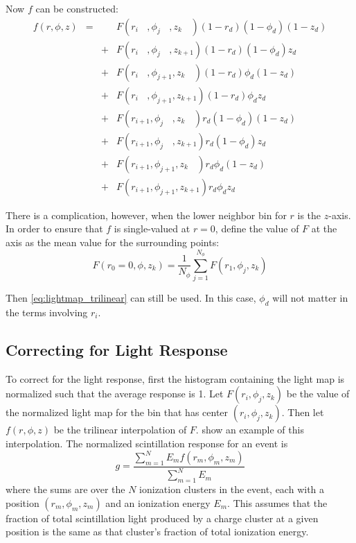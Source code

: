 \documentclass[herrin-thesis.tex]{subfiles}
\begin{document}
Now \(f\) can be constructed:
\begin{align}
f(r, \phi, z) &=&   & F(r_{i\phantom{+1}}, \phi_{j\phantom{+1}}, z_{k\phantom{+1}}) (1-r_d)(1-\phi_d)(1-z_d)	\nonumber\\
		& & + & F(r_{i\phantom{+1}}, \phi_{j\phantom{+1}}, z_{k+1})		     (1-r_d)(1-\phi_d)z_d 		\nonumber\\
		& & + & F(r_{i\phantom{+1}}, \phi_{j+1},		      z_{k\phantom{+1}}) (1-r_d)\phi_d(1-z_d)		\nonumber\\
		& & + & F(r_{i\phantom{+1}}, \phi_{j+1}, 		      z_{k+1})		     (1-r_d)\phi_d z_d			\nonumber\\
		& & + & F(r_{i+1}, 		     \phi_{j\phantom{+1}}, z_{k\phantom{+1}}) r_d(1-\phi_d)(1-z_d)		\nonumber\\
		& & + & F(r_{i+1}, 		     \phi_{j\phantom{+1}}, z_{k+1})		     r_d(1-\phi_d)z_d			\nonumber\\
		& & + & F(r_{i+1}, 		     \phi_{j+1}, 		      z_{k\phantom{+1}})  r_d\phi_d(1-z_d)			\nonumber\\
		& & + & F(r_{i+1},		     \phi_{j+1}, 		      z_{k+1})		      r_d\phi_dz_d
\label{eq:lightmap_trilinear}
\end{align}

There is a complication, however, when the lower neighbor bin for \(r\) is the \(z\)-axis. In order to ensure that \(f\) is single-valued at \(r=0\), define the value of \(F\) at the axis as the mean value for the surrounding points: 
\begin{equation}
F(r_{0}=0, \phi, z_k) = \frac{1}{N_\phi}\sum_{j=1}^{N_\phi} F(r_{1}, \phi_j, z_k)
\end{equation}

Then \cref{eq:lightmap_trilinear} can still be used. In this case, \(\phi_d\) will not matter in the terms involving \(r_i\).

\subsection{Correcting for Light Response}

To correct for the light response, first the histogram containing the light map is normalized such that the average response is 1. Let \(F(r_i, \phi_j, z_k)\) be the value of the normalized light map for the bin that has center \((r_i, \phi_j, z_k)\). Then let \(f(r,\phi,z)\) be the trilinear interpolation of \(F\).  show an example of this interpolation. The normalized scintillation response for an event is
\begin{equation}
g = \frac{\sum_{m=1}^{N}E_m f(r_m, \phi_m, z_m)}{\sum_{m=1}^{N}E_m}
\label{eq:lightmap_weighted_response}
\end{equation}
where the sums are over the \(N\) ionization clusters in the event, each with a position \((r_m, \phi_m, z_m)\) and an ionization energy \(E_m\). This assumes that the fraction of total scintillation light produced by a charge cluster at a given position is the same as that cluster's fraction of total ionization energy.
\end{document}
